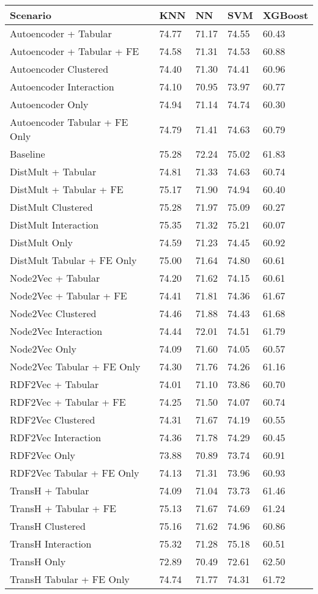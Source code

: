 \begin{tabular}{lllll}
\toprule
Scenario & KNN & NN & SVM & XGBoost \\
\midrule
Autoencoder + Tabular & 74.77 & 71.17 & 74.55 & 60.43 \\
Autoencoder + Tabular + FE & 74.58 & 71.31 & 74.53 & 60.88 \\
Autoencoder Clustered & 74.40 & 71.30 & 74.41 & 60.96 \\
Autoencoder Interaction & 74.10 & 70.95 & 73.97 & 60.77 \\
Autoencoder Only & 74.94 & 71.14 & 74.74 & 60.30 \\
Autoencoder Tabular + FE Only & 74.79 & 71.41 & 74.63 & 60.79 \\
Baseline & 75.28 & 72.24 & 75.02 & 61.83 \\
DistMult + Tabular & 74.81 & 71.33 & 74.63 & 60.74 \\
DistMult + Tabular + FE & 75.17 & 71.90 & 74.94 & 60.40 \\
DistMult Clustered & 75.28 & 71.97 & 75.09 & 60.27 \\
DistMult Interaction & 75.35 & 71.32 & 75.21 & 60.07 \\
DistMult Only & 74.59 & 71.23 & 74.45 & 60.92 \\
DistMult Tabular + FE Only & 75.00 & 71.64 & 74.80 & 60.61 \\
Node2Vec + Tabular & 74.20 & 71.62 & 74.15 & 60.61 \\
Node2Vec + Tabular + FE & 74.41 & 71.81 & 74.36 & 61.67 \\
Node2Vec Clustered & 74.46 & 71.88 & 74.43 & 61.68 \\
Node2Vec Interaction & 74.44 & 72.01 & 74.51 & 61.79 \\
Node2Vec Only & 74.09 & 71.60 & 74.05 & 60.57 \\
Node2Vec Tabular + FE Only & 74.30 & 71.76 & 74.26 & 61.16 \\
RDF2Vec + Tabular & 74.01 & 71.10 & 73.86 & 60.70 \\
RDF2Vec + Tabular + FE & 74.25 & 71.50 & 74.07 & 60.74 \\
RDF2Vec Clustered & 74.31 & 71.67 & 74.19 & 60.55 \\
RDF2Vec Interaction & 74.36 & 71.78 & 74.29 & 60.45 \\
RDF2Vec Only & 73.88 & 70.89 & 73.74 & 60.91 \\
RDF2Vec Tabular + FE Only & 74.13 & 71.31 & 73.96 & 60.93 \\
TransH + Tabular & 74.09 & 71.04 & 73.73 & 61.46 \\
TransH + Tabular + FE & 75.13 & 71.67 & 74.69 & 61.24 \\
TransH Clustered & 75.16 & 71.62 & 74.96 & 60.86 \\
TransH Interaction & 75.32 & 71.28 & 75.18 & 60.51 \\
TransH Only & 72.89 & 70.49 & 72.61 & 62.50 \\
TransH Tabular + FE Only & 74.74 & 71.77 & 74.31 & 61.72 \\
\bottomrule
\end{tabular}
